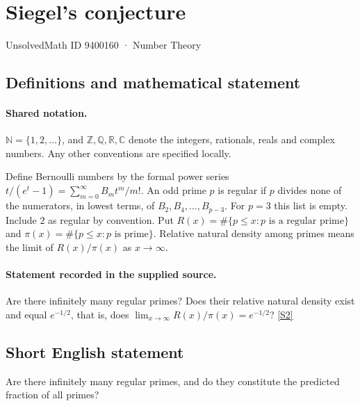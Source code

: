 \documentclass[11pt]{article}
\newcommand{\sref}[2]{\hyperlink{source:#1:#2}{[S#2]}}
\begin{document}
\setcounter{section}{9400159}
\section{Siegel's conjecture}\label{9400160}
{\small\sffamily UnsolvedMath ID 9400160 · Number Theory}
\subsection{Definitions and mathematical statement}

\paragraph{Shared notation.}$\mathbb N=\{1,2,\ldots\}$, and $\mathbb Z,\mathbb Q,\mathbb R,\mathbb C$ denote the integers, rationals, reals and complex numbers. Any other conventions are specified locally.


Define Bernoulli numbers by the formal power series $t/(e^t-1)=\sum_{m=0}^{\infty}B_mt^m/m!$. An odd prime $p$ is regular if $p$ divides none of the numerators, in lowest terms, of $B_2,B_4,\ldots,B_{p-3}$. For $p=3$ this list is empty. Include $2$ as regular by convention. Put $R(x)=\#\{p\le x:p\text{ is a regular prime}\}$ and $\pi(x)=\#\{p\le x:p\text{ is prime}\}$. Relative natural density among primes means the limit of $R(x)/\pi(x)$ as $x\to\infty$.
\paragraph{Statement recorded in the supplied source.}
Are there infinitely many regular primes? Does their relative natural density exist and equal $e^{-1/2}$, that is, does $\lim_{x\to\infty}R(x)/\pi(x)=e^{-1/2}$? \sref{9400160}{2}
\subsection{Short English statement}
Are there infinitely many regular primes, and do they constitute the predicted fraction of all primes?
\end{document}
